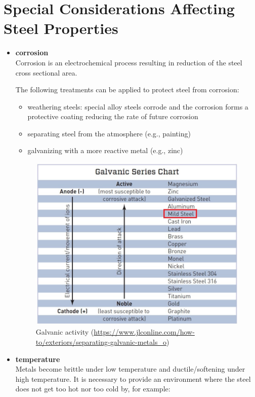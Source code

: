 \section{Special Considerations Affecting Steel Properties}
\begin{itemize}
\item \textbf{corrosion}\\
Corrosion is an electrochemical process resulting in reduction of the steel cross sectional area.

The following treatments can be applied to protect steel from corrosion:
\begin{itemize}
\item weathering steels: special alloy steels corrode and the corrosion forms a protective coating reducing the rate of future corrosion
\item separating steel from the atmosphere (e.g., painting)
\item galvanizing with a more reactive metal (e.g., zinc)
\end{itemize}
\begin{figure}[H]
\centering\footnotesize
\includegraphics[width=15cm]{PIC/CH02/GAL}
\caption{Galvanic activity (\href{https://www.jlconline.com/how-to/exteriors/separating-galvanic-metals_o}{\url{https://www.jlconline.com/how-to/exteriors/separating-galvanic-metals_o}})}
\end{figure}
\item \textbf{temperature}\\
Metals become brittle under low temperature and ductile/softening under high temperature. It is necessary to provide an environment where the steel does not get too hot nor too cold by, for example:

\end{itemize}
